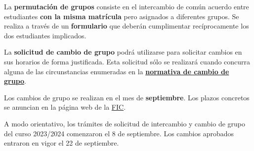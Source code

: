 La \textbf{permutación de grupos} consiste en el intercambio de común acuerdo entre estudiantes \textbf{con la misma matrícula} pero asignados a diferentes grupos.
Se realiza a través de un \textbf{formulario} que deberán cumplimentar recíprocamente los dos estudiantes implicados.


La \textbf{solicitud de cambio de grupo} podrá utilizarse para solicitar cambios en sus horarios de forma justificada. Esta solicitud sólo se realizará cuando concurra alguna de las circunstancias enumeradas en la \href{https://www.fic.udc.es/sites/default/files/adjuntos_noticias/normativa_cambio_grupo_fic.pdf}{\textbf{normativa de cambio de grupo}}.


Los cambios de grupo se realizan en el mes de \textbf{septiembre}. Los plazos concretos se anuncian en la página web de la  \href{\linkFIC}{\acrshort{FIC}}.

\begin{exampleBox}
    A modo orientativo, los trámites de solicitud de intercambio y cambio de grupo del curso 2023/2024 comenzaron el 8 de septiembre. Los cambios aprobados entraron en vigor el 22 de septiembre.
\end{exampleBox}

